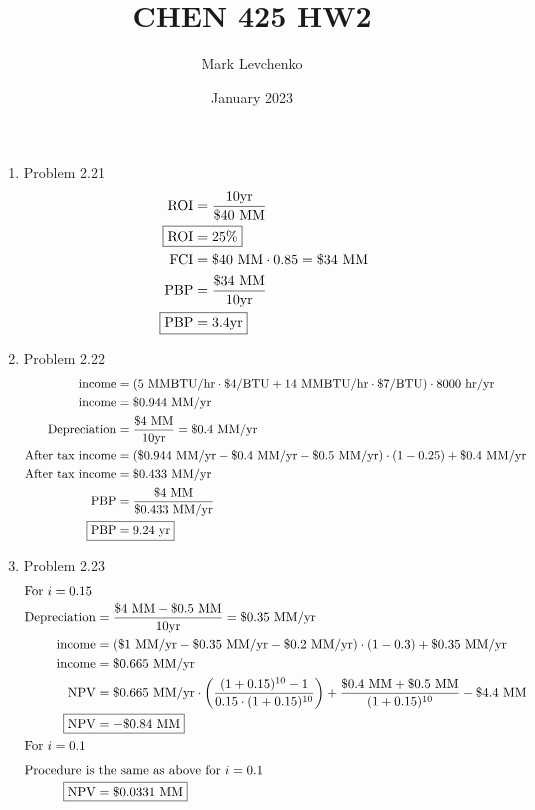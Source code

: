 \documentclass[12pt]{article}
\title{CHEN 425 HW2}
\author{Mark Levchenko}
\date{January 2023}
\begin{document}
\begin{enumerate}
\newpage
    \item Problem 2.21
    \begin{align*}
        \mathrm{ROI} &= \frac{10 \mathrm{yr}}{\$ 40 \text{ MM}} \\
        \Aboxed{\mathrm{ROI} &= 25\%} \\
        \mathrm{FCI} &= \$ 40 \text{ MM} \cdot 0.85 = \$ 34 \text{ MM} \\
        \mathrm{PBP} &= \frac{\$ 34 \text{ MM}}{10 \mathrm{yr}} \\
        \Aboxed{\mathrm{PBP} &= 3.4 \mathrm{yr}}
    \end{align*}


\newpage
    \item Problem 2.22
    \begin{align*}
        \mathrm{income} &= (5 \text{ MMBTU/hr} \cdot \$4/\mathrm{BTU} + 14 \text{ MMBTU/hr} \cdot \$7/\mathrm{BTU}) \cdot 8000 \text{ hr/yr} \\
        \mathrm{income} &= \$0.944 \text{ MM/yr} \\
        \mathrm{Depreciation} &= \frac{\$ 4 \text{ MM}}{10 \mathrm{yr}} = \$0.4 \text{ MM/yr} \\
        \text{After tax income} &= (\$0.944 \text{ MM/yr} - \$0.4 \text{ MM/yr} - \$0.5 \text{ MM/yr}) \cdot (1 - 0.25) + \$0.4 \text{ MM/yr} \\
        \text{After tax income} &= \$0.433 \text{ MM/yr} \\
        \mathrm{PBP} &= \frac{\$4 \text{ MM}}{\$0.433 \text{ MM/yr}} \\
        \Aboxed{\mathrm{PBP} &= 9.24 \text{ yr}}
    \end{align*}


\newpage
    \item Problem 2.23
    \begin{align*}
        \intertext{For $i=0.15$}
        \mathrm{Depreciation} &= \frac{\$ 4 \text{ MM} - \$ 0.5 \text{ MM}}{10 \mathrm{yr}} = \$0.35 \text{ MM/yr} \\
        \mathrm{income} &= (\$1 \text{ MM/yr} - \$0.35 \text{ MM/yr} - \$0.2 \text{ MM/yr}) \cdot (1 - 0.3) + \$0.35 \text{ MM/yr} \\
        \mathrm{income} &= \$0.665 \text{ MM/yr} \\
        \mathrm{NPV} &= \$0.665 \text{ MM/yr} \cdot \left( \frac{(1+0.15)^{10}-1}{0.15\cdot(1+0.15)^{10}} \right) + \frac{\$0.4 \text{ MM} + \$0.5 \text{ MM}}{(1+0.15)^{10}} - \$4.4 \text{ MM} \\ 
        \Aboxed{\mathrm{NPV} &= - \$0.84 \text{ MM}} \\ 
        \intertext{For $i=0.1$}
        \intertext{Procedure is the same as above for $i=0.1$}
        \Aboxed{\mathrm{NPV} &= \$0.0331 \text{ MM}}
    \end{align*}


\end{enumerate}
\end{document}
